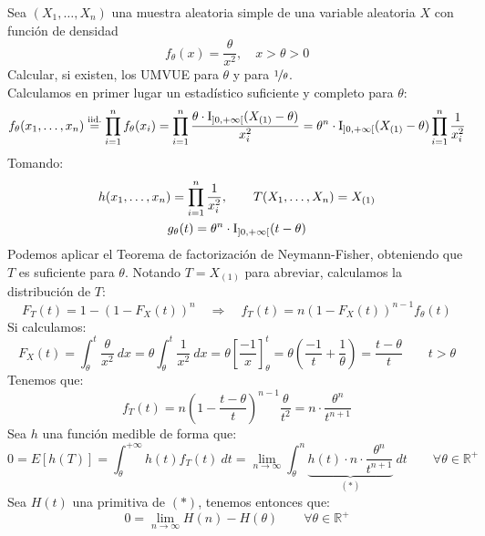 \begin{ejercicio}
    Sea $(X_1, \ldots, X_n)$ una muestra aleatoria simple de una variable aleatoria $X$ con función de densidad
    \begin{equation*}
        f_\theta(x) = \dfrac{\theta}{x^2}, \quad x>\theta > 0
    \end{equation*}
    Calcular, si existen, los UMVUE para $\theta$ y para $\nicefrac{1}{\theta}$.\\

    \noindent
    Calculamos en primer lugar un estadístico suficiente y completo para $\theta$:
    \begin{equation*}
        f_\theta(x_1,\ldots, x_n) \stackrel{\text{iid.}}{=} \prod_{i=1}^{n}f_\theta(x_i) =\prod_{i=1}^{n} \dfrac{\theta\cdot \operatorname{I}_{\left]0,+\infty\right[}(X_{(1)}-\theta)}{x_i^2} = \theta^n \cdot \operatorname{I}_{\left]0,+\infty\right[}(X_{(1)}-\theta)\prod_{i=1}^{n} \dfrac{1}{x_i^2}
    \end{equation*}
    Tomando:
    \begin{gather*}
        h(x_1, \ldots, x_n) = \prod_{i=1}^{n}\dfrac{1}{x_i^2}, \qquad T(X_1, \ldots, X_n) = X_{(1)} \\
        g_\theta(t) = \theta^n \cdot \operatorname{I}_{\left]0,+\infty\right[}(t-\theta)
    \end{gather*}
    Podemos aplicar el Teorema de factorización de Neymann-Fisher, obteniendo que $T$ es suficiente para $\theta$. Notando $T = X_{(1)}$ para abreviar, calculamos la distribución de $T$:
    \begin{equation*}
        F_T(t) = 1-{(1-F_X(t))}^{n} \quad \Longrightarrow \quad f_T(t) = n{(1-F_X(t))}^{n-1}f_\theta(t)
    \end{equation*}
    Si calculamos:
    \begin{equation*}
        F_X(t) = \int_{\theta}^{t} \dfrac{\theta}{x^2}~dx  = \theta \int_{\theta}^{t} \dfrac{1}{x^2}~dx = \theta \left[\dfrac{-1}{x}\right]_\theta^t = \theta\left(\dfrac{-1}{t}+\dfrac{1}{\theta}\right) = \dfrac{t-\theta}{t} \qquad  t > \theta
    \end{equation*}
    Tenemos que:
    \begin{equation*}
        f_T(t) = n{\left(1-\dfrac{t-\theta}{t}\right)}^{n-1}\dfrac{\theta}{t^2} = n\cdot \dfrac{\theta^{n}}{t^{n+1}}
    \end{equation*}
    Sea $h$ una función medible de forma que:
    \begin{equation*}
        0 = E[h(T)] = \int_{\theta}^{+\infty} h(t)f_T(t)~dt  = \lim_{n\to\infty}\int_{\theta}^{n} \underbrace{h(t)\cdot n\cdot \frac{\theta^n}{t^{n+1}}}_{(\ast)}~dt  \qquad \forall \theta\in \mathbb{R}^+
    \end{equation*}
    Sea $H(t)$ una primitiva de $(\ast)$, tenemos entonces que:
    \begin{equation*}
         0 = \lim_{n\to\infty}H(n) - H(\theta) \qquad \forall \theta\in \mathbb{R}^+
    \end{equation*}


\end{ejercicio}

